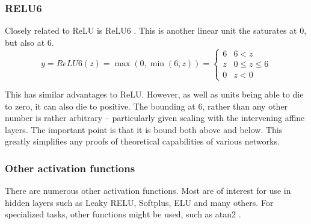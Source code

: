 \documentclass[12pt,parskip]{komatufte}
\begin{document}
\subsubsection{RELU6}


Closely related to ReLU is ReLU6 .
This is another linear unit the saturates at 0, but also at 6.
\begin{equation}
y=ReLU6(z)=\max \left(0, \min\left(6, z\right) \right) =  \begin{cases}
6 & 6<z\\
z & 0\le z\le6\\
0 & z<0
\end{cases}
\end{equation}

This has similar advantages to ReLU.
However, as well as units being able to die to zero, it can also die to positive.
The bounding at 6, rather than any other number is rather arbitrary -- particularly given scaling with the intervening affine layers.
The important point is that it is bound both above and below.
This greatly simplifies any proofs of theoretical capabilities of various networks.



\subsubsection{Other activation functions}

There are numerous other activation functions.
Most are of interest for use in hidden layers such as Leaky RELU, Softplus, ELU and many others.
For specialized tasks, other functions might be used, such as atan2 .
\end{document}

